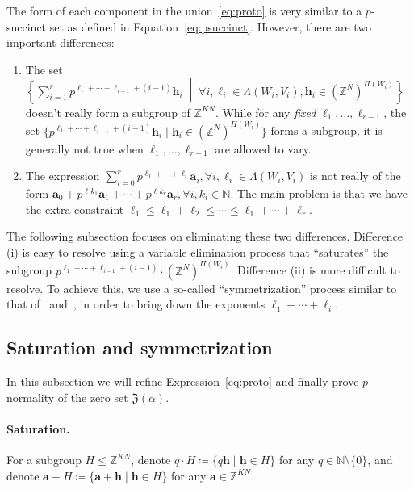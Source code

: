 \documentclass[letterpaper, 11pt, thm-restate]{article}
\numberwithin{equation}{section}
\newcommand{\Z}{\mathbb{Z}}
\newcommand{\N}{\mathbb{N}}
\newcommand{\mZ}{\mathfrak{Z}}
\newcommand{\ba}{\boldsymbol{a}}
\newcommand{\bh}{\boldsymbol{h}}
\theoremstyle{definition}
\theoremstyle{definition}
\theoremstyle{definition}
\begin{document}
The form of each component in the union~\eqref{eq:proto} is very similar to a $p$-succinct set as defined in Equation~\eqref{eq:psuccinct}.
However, there are two important differences:
\begin{enumerate}[noitemsep, label=(\roman*)]
    \item The set $\left\{\sum_{i = 1}^r p^{\ell_1 + \cdots + \ell_{i-1} + (i-1)} \bh_i \;\middle|\; \forall i, \ell_i \in \Lambda(W_i, V_i), \bh_i \in (\Z^N)^{\Pi(W_i)}\right\}$ doesn't really form a subgroup of $\Z^{KN}$. While for any \emph{fixed} $\ell_1, \ldots, \ell_{r-1}$, the set $\big\{p^{\ell_1 + \cdots + \ell_{i-1} + (i-1)} \bh_i \;\big|\; \bh_i \in (\Z^N)^{\Pi(W_i)} \big\}$ forms a subgroup, it is generally not true when $\ell_1, \ldots, \ell_{r-1}$ are allowed to vary.
    \item The expression $\sum_{i = 0}^r p^{\ell_1 + \cdots + \ell_{i}} \ba_i, \forall i, \ell_i \in \Lambda(W_i, V_i)$ is not really of the form $\ba_0 + p^{\ell k_1} \ba_1 + \cdots + p^{\ell k_r} \ba_r, \forall i, k_i \in \N$.
    The main problem is that we have the extra constraint $\ell_1 \leq \ell_1 + \ell_2 \leq \cdots \leq \ell_1 + \cdots + \ell_{r}$.
\end{enumerate}

The following subsection focuses on eliminating these two differences.
Difference (i) is easy to resolve using a variable elimination process that ``saturates'' the subgroup $p^{\ell_1 + \cdots + \ell_{i-1} + (i-1)} \cdot (\Z^N)^{\Pi(W_i)}$.
Difference (ii) is more difficult to resolve.
To achieve this, we use a so-called ``symmetrization'' process similar to that of~\cite[Lemma~8.1]{derksen2007skolem} and~\cite[Lemma~12.1]{derksen2012linear}, in order to bring down the exponents $\ell_1 + \cdots + \ell_{i}$.

\subsection{Saturation and symmetrization}\label{subsec:symm}
In this subsection we will refine Expression~\eqref{eq:proto} and finally prove $p$-normality of the zero set $\mZ(\alpha)$.

\paragraph{Saturation.}
For a subgroup $H \leq \Z^{KN}$, denote $q \cdot H \coloneqq \{q \bh \mid \bh \in H\}$ for any $q \in \N \setminus \{0\}$, and denote $\ba + H \coloneqq \{\ba + \bh \mid \bh \in H\}$ for any $\ba \in \Z^{KN}$.
\end{document}
